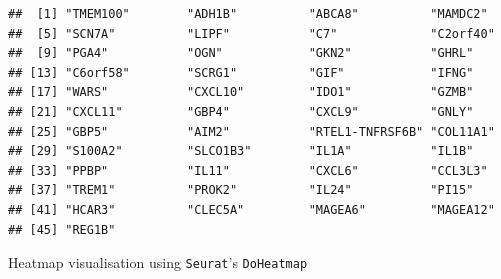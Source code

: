 \documentclass[
  12pt,
]{book}
\newenvironment{Shaded}{\begin{snugshade}}{\end{snugshade}}
\newcommand{\AttributeTok}[1]{\textcolor[rgb]{0.13,0.29,0.53}{#1}}
\newcommand{\CommentTok}[1]{\textcolor[rgb]{0.56,0.35,0.01}{\textit{#1}}}
\newcommand{\DecValTok}[1]{\textcolor[rgb]{0.00,0.00,0.81}{#1}}
\newcommand{\FunctionTok}[1]{\textcolor[rgb]{0.13,0.29,0.53}{\textbf{#1}}}
\newcommand{\NormalTok}[1]{#1}
\newcommand{\OtherTok}[1]{\textcolor[rgb]{0.56,0.35,0.01}{#1}}
\newcommand{\SpecialCharTok}[1]{\textcolor[rgb]{0.81,0.36,0.00}{\textbf{#1}}}
\newcommand{\StringTok}[1]{\textcolor[rgb]{0.31,0.60,0.02}{#1}}
\begin{document}
\begin{Shaded}
\end{Shaded}

\begin{verbatim}
##  [1] "TMEM100"        "ADH1B"          "ABCA8"          "MAMDC2"        
##  [5] "SCN7A"          "LIPF"           "C7"             "C2orf40"       
##  [9] "PGA4"           "OGN"            "GKN2"           "GHRL"          
## [13] "C6orf58"        "SCRG1"          "GIF"            "IFNG"          
## [17] "WARS"           "CXCL10"         "IDO1"           "GZMB"          
## [21] "CXCL11"         "GBP4"           "CXCL9"          "GNLY"          
## [25] "GBP5"           "AIM2"           "RTEL1-TNFRSF6B" "COL11A1"       
## [29] "S100A2"         "SLCO1B3"        "IL1A"           "IL1B"          
## [33] "PPBP"           "IL11"           "CXCL6"          "CCL3L3"        
## [37] "TREM1"          "PROK2"          "IL24"           "PI15"          
## [41] "HCAR3"          "CLEC5A"         "MAGEA6"         "MAGEA12"       
## [45] "REG1B"
\end{verbatim}

Heatmap visualisation using \texttt{Seurat}'s \texttt{DoHeatmap}

\begin{Shaded}
\end{Shaded}
\end{document}
